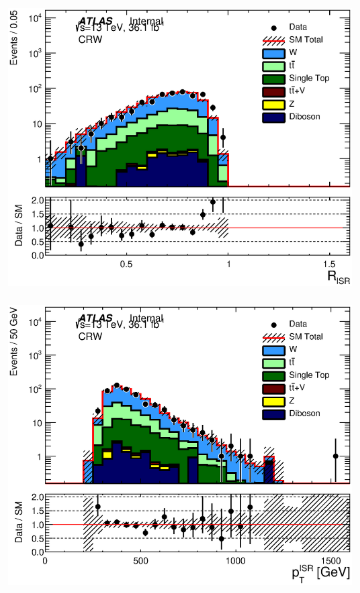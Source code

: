 \pagebreak

\begin{figure}[h!]
  \begin{center}
      \begin{subfigure}[b]{0.40\textwidth}    
    	 \includegraphics[width=\textwidth]{figures/plotRegion/CA_RISR_CRW_log.eps}
                \caption{ }
    \end{subfigure}
        \begin{subfigure}[b]{0.40\textwidth}    
    	 \includegraphics[width=\textwidth]{figures/plotRegion/CA_PTISR_CRW_log.eps}
                \caption{ }

\end{subfigure}
\end{center}
\end{figure}
